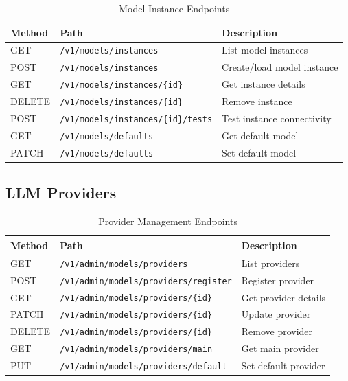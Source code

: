 \begin{table}[ht]
\centering
\caption{Model Instance Endpoints}
\label{tab:model-instance-endpoints}
\small
\begin{tabularx}{\textwidth}{llX}
    \hline
    \textbf{Method} & \textbf{Path} & \textbf{Description} \\
    \hline
    GET & \texttt{/v1/models/instances} & List model instances \\
    POST & \texttt{/v1/models/instances} & Create/load model instance \\
    GET & \texttt{/v1/models/instances/\{id\}} & Get instance details \\
    DELETE & \texttt{/v1/models/instances/\{id\}} & Remove instance \\
    POST & \texttt{/v1/models/instances/\{id\}/tests} & Test instance connectivity \\
    GET & \texttt{/v1/models/defaults} & Get default model \\
    PATCH & \texttt{/v1/models/defaults} & Set default model \\
    \hline
\end{tabularx}
\end{table}

\subsection{LLM Providers}

\begin{table}[ht]
\centering
\caption{Provider Management Endpoints}
\label{tab:provider-endpoints}
\small
\begin{tabularx}{\textwidth}{llX}
    \hline
    \textbf{Method} & \textbf{Path} & \textbf{Description} \\
    \hline
    GET & \texttt{/v1/admin/models/providers} & List providers \\
    POST & \texttt{/v1/admin/models/providers/register} & Register provider \\
    GET & \texttt{/v1/admin/models/providers/\{id\}} & Get provider details \\
    PATCH & \texttt{/v1/admin/models/providers/\{id\}} & Update provider \\
    DELETE & \texttt{/v1/admin/models/providers/\{id\}} & Remove provider \\
    GET & \texttt{/v1/admin/models/providers/main} & Get main provider \\
    PUT & \texttt{/v1/admin/models/providers/default} & Set default provider \\
    \hline
\end{tabularx}
\end{table}

